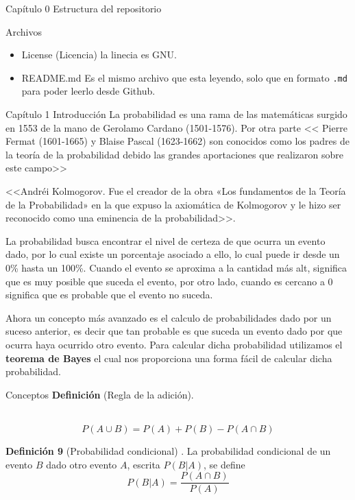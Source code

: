 \documentclass[
  spanish,
  ignorenonframetext,
]{beamer}
\providecommand{\tightlist}{%
  \setlength{\itemsep}{0pt}\setlength{\parskip}{0pt}}
\begin{document}
\begin{frame}{Capítulo 0 Estructura del
repositorio}
\begin{block}{Archivos}
\protect\hypertarget{archivos}{}
\begin{itemize}
\tightlist
\item
  License (Licencia) la linecia es GNU.
\item
  README.md Es el mismo archivo que esta leyendo, solo que en formato
  \texttt{.md} para poder leerlo desde Github.
\end{itemize}
\end{block}
\end{frame}

\begin{frame}[allowframebreaks]{Capítulo 1 Introducción}
\protect\hypertarget{capuxedtulo-1-introducciuxf3n}{}
La probabilidad es una rama de las matemáticas surgido en 1553 de la
mano de Gerolamo Cardano (1501-1576). Por otra parte
\textless\textless{} Pierre Fermat (1601-1665) y Blaise Pascal
(1623-1662) son conocidos como los padres de la teoría de la
probabilidad debido las grandes aportaciones que realizaron sobre este
campo\textgreater\textgreater{}

\textless\textless Andréi Kolmogorov. Fue el creador de la obra «Los
fundamentos de la Teoría de la Probabilidad» en la que expuso la
axiomática de Kolmogorov y le hizo ser reconocido como una eminencia de
la probabilidad\textgreater\textgreater.

La probabilidad busca encontrar el nivel de certeza de que ocurra un
evento dado, por lo cual existe un porcentaje asociado a ello, lo cual
puede ir desde un 0\% hasta un 100\%. Cuando el evento se aproxima a la
cantidad más alt, significa que es muy posible que suceda el evento, por
otro lado, cuando es cercano a 0 significa que es probable que el evento
no suceda.

Ahora un concepto más avanzado es el calculo de probabilidades dado por
un suceso anterior, es decir que tan probable es que suceda un evento
dado por que ocurra haya ocurrido otro evento. Para calcular dicha
probabilidad utilizamos el \textbf{teorema de Bayes} el cual nos
proporciona una forma fácil de calcular dicha probabilidad.

\begin{block}{Conceptos}
\protect\hypertarget{conceptos}{}
\textbf{Definición} (Regla de la adición).

\hspace{0pt}\\
\[
P(A \cup B) = P(A) + P(B) - P(A \cap B)
\]

\textbf{Definición 9 }(Probabilidad condicional) . La probabilidad
condicional de un evento \(B\) dado otro evento \(A\), escrita
\(P(B|A)\), se define \[
P(B|A)=\frac{P (A\cap B)}{P(A)}
\]


\end{block}
\end{frame}
\end{document}
